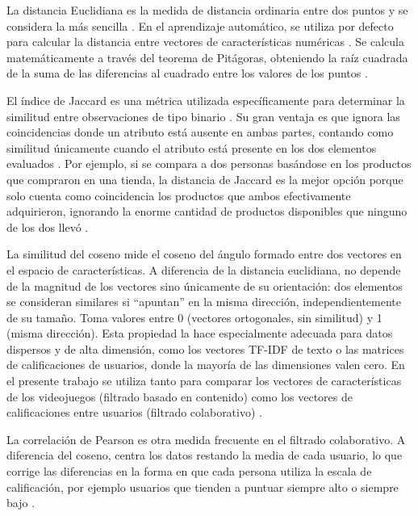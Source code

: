 La distancia Euclidiana es la medida de distancia ordinaria entre dos puntos y se considera la más sencilla \parencite{CorreaHenao2021}. En el aprendizaje automático, se utiliza por defecto para calcular la distancia entre vectores de características numéricas \parencite{BadilloEtAl2020}. Se calcula matemáticamente a través del teorema de Pitágoras, obteniendo la raíz cuadrada de la suma de las diferencias al cuadrado entre los valores de los puntos \parencite{BadilloEtAl2020, CorreaHenao2021}.

El índice de Jaccard es una métrica utilizada específicamente para determinar la similitud entre observaciones de tipo binario \parencite{CorreaHenao2021}. Su gran ventaja es que ignora las coincidencias donde un atributo está ausente en ambas partes, contando como similitud únicamente cuando el atributo está presente en los dos elementos evaluados \parencite{CorreaHenao2021}. Por ejemplo, si se compara a dos personas basándose en los productos que compraron en una tienda, la distancia de Jaccard es la mejor opción porque solo cuenta como coincidencia los productos que ambos efectivamente adquirieron, ignorando la enorme cantidad de productos disponibles que ninguno de los dos llevó \parencite{CorreaHenao2021}.

La similitud del coseno mide el coseno del ángulo formado entre dos vectores en el espacio de características. A diferencia de la distancia euclidiana, no depende de la magnitud de los vectores sino únicamente de su orientación: dos elementos se consideran similares si \enquote{apuntan} en la misma dirección, independientemente de su tamaño. Toma valores entre 0 (vectores ortogonales, sin similitud) y 1 (misma dirección). Esta propiedad la hace especialmente adecuada para datos dispersos y de alta dimensión, como los vectores TF-IDF de texto o las matrices de calificaciones de usuarios, donde la mayoría de las dimensiones valen cero. En el presente trabajo se utiliza tanto para comparar los vectores de características de los videojuegos (filtrado basado en contenido) como los vectores de calificaciones entre usuarios (filtrado colaborativo) \parencite{CorreaHenao2021, KoEtAl2022}.

La correlación de Pearson es otra medida frecuente en el filtrado colaborativo. A diferencia del coseno, centra los datos restando la media de cada usuario, lo que corrige las diferencias en la forma en que cada persona utiliza la escala de calificación, por ejemplo usuarios que tienden a puntuar siempre alto o siempre bajo \parencite{KoEtAl2022}.

